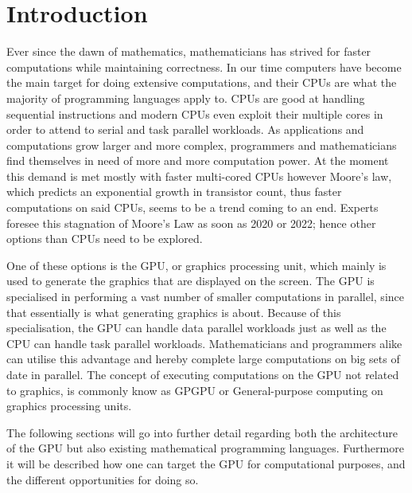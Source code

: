 \chapter{Introduction} %
\label{cha:introduction}
Ever since the dawn of mathematics, mathematicians has strived for faster computations while maintaining correctness.
In our time computers have become the main target for doing extensive computations, and their CPUs are what the majority of programming languages apply to.
CPUs are good at handling sequential instructions and modern CPUs even exploit their multiple cores in order to attend to serial and task parallel workloads.
As applications and computations grow larger and more complex, programmers and mathematicians find themselves in need of more and more computation power.
At the moment this demand is met mostly with faster multi-cored CPUs however Moore's law, which predicts an exponential growth in transistor count, thus faster computations on said CPUs, seems to be a trend coming to an end.
Experts foresee this stagnation of Moore's Law as soon as 2020 or 2022; hence other options than CPUs need to be explored. \citep{Moore2013}

One of these options is the GPU, or graphics processing unit, which mainly is used to generate the graphics that are displayed on the screen.
The GPU is specialised in performing a vast number of smaller computations in parallel, since that essentially is what generating graphics is about.
Because of this specialisation, the GPU can handle data parallel workloads just as well as the CPU can handle task parallel workloads.
Mathematicians and programmers alike can utilise this advantage and hereby complete large computations on big sets of date in parallel.
The concept of executing computations on the GPU not related to graphics, is commonly know as GPGPU or General-purpose computing on graphics processing units. 

The following sections will go into further detail regarding both the architecture of the GPU but also existing mathematical programming languages.
Furthermore it will be described how one can target the GPU for computational purposes, and the different opportunities for doing so. 



